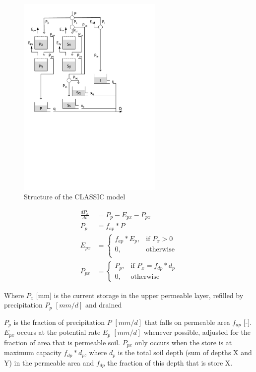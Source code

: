 { 																	%
\begin{figure}
\includegraphics[trim=1cm 12cm 7cm 1cm,width=7cm,keepaspectratio]{./AppA_files/46_schematic.pdf}
\caption{Structure of the CLASSIC model} \label{fig:46_schematic}
\end{figure}


\begin{align}
	\frac{dP_x}{dt} &= P_p-E_{px}-P_{px} \\
	P_p &= f_{ap} * P\\
	E_{px} &= 
	\begin{cases}
		f_{ap}*E_p, & \text{if } P_x > 0 \\
		0, & \text{otherwise}\\
	\end{cases}\\
	P_{px} &= 
	\begin{cases}
		P_p, & \text{if } P_x = f_{dp}*d_p \\
		0, & \text{otherwise}
	\end{cases}
\end{align}

Where $P_x$ [mm] is the current storage in the upper permeable layer, refilled by precipitation $P_p$ $[mm/d]$ and drained 

} %

\noindent 
$P_p$ is the fraction of precipitation $P$ $[mm/d]$ that falls on permeable area $f_{ap}$ [-].
$E_{px}$ occurs at the potential rate $E_p$ $[mm/d]$ whenever possible, adjusted for the fraction of area that is permeable soil.
$P_{px}$ only occurs when the store is at maximum capacity $f_{dp}*d_p$, where $d_p$ is the total soil depth (sum of depths X and Y) in the permeable area and $f_{dp}$ the fraction of this depth that is store X.

